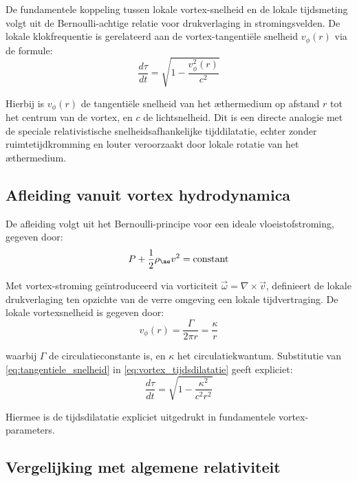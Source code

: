 De fundamentele koppeling tussen lokale vortex-snelheid en de lokale tijdsmeting volgt uit de Bernoulli-achtige relatie voor drukverlaging in stromingsvelden. De lokale klokfrequentie is gerelateerd aan de vortex-tangentiële snelheid $v_{\phi}(r)$ via de formule:
\begin{equation}\label{eq:vortex_tijdsdilatatie}
    \frac{d\tau}{dt} = \sqrt{1 - \frac{v_{\phi}^2(r)}{c^2}}
\end{equation}

Hierbij is $v_{\phi}(r)$ de tangentiële snelheid van het æthermedium op afstand $r$ tot het centrum van de vortex, en $c$ de lichtsnelheid. Dit is een directe analogie met de speciale relativistische snelheidsafhankelijke tijddilatatie, echter zonder ruimtetijdkromming en louter veroorzaakt door lokale rotatie van het æthermedium.

\subsection{Afleiding vanuit vortex hydrodynamica}

De afleiding volgt uit het Bernoulli-principe voor een ideale vloeistofstroming, gegeven door:
\begin{equation}\label{eq:Bernoulli}
    P + \frac{1}{2}\rho_{\ae} v^2 = \text{constant}
\end{equation}

Met vortex-stroming geïntroduceerd via vorticiteit $\vec{\omega} = \nabla \times \vec{v}$, definieert de lokale drukverlaging ten opzichte van de verre omgeving een lokale tijdvertraging. De lokale vortexsnelheid is gegeven door:
\begin{equation}\label{eq:tangentiele_snelheid}
    v_{\phi}(r) = \frac{\Gamma}{2\pi r} = \frac{\kappa}{r}
\end{equation}

waarbij $\Gamma$ de circulatieconstante is, en $\kappa$ het circulatiekwantum. Substitutie van \eqref{eq:tangentiele_snelheid} in \eqref{eq:vortex_tijdsdilatatie} geeft expliciet:
\begin{equation}\label{eq:vortex_tijd_expliciet}
    \frac{d\tau}{dt} = \sqrt{1 - \frac{\kappa^2}{c^2 r^2}}
\end{equation}

Hiermee is de tijdsdilatatie expliciet uitgedrukt in fundamentele vortex-parameters.

\subsection{Vergelijking met algemene relativiteit}

